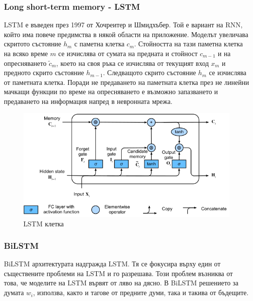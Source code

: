 \documentclass{article}
\begin{document}
\subsubsection{Long short-term memory - LSTM}

LSTM е въведен през 1997 от Хочреитер и Шмидхъбер. Той е вариант на RNN, който има повече предимства в някой области на
приложение. Моделът увеличава скритото състояние $h_m$ с паметна клетка $c_m$. Стойността на тази паметна клетка на
всяко време $m$ се изчислява от сумата на предната и стойност $c_{m{-}1}$ и на опресняването $\tilde{c}_m$, което на
своя ръка се изчислява от текущият вход $x_m$ и предното скрито състояние $h_{m{-}1}$. Следващото скрито състояние
$h_m$ се изчислява от паметната клетка. Поради не предаването на паметната клетка през не линейни мачкащи функции по
време на опресняването е възможно запазването и предаването на информация напред в невронната мрежа.
\cite{intro-to-nlp-mit}

\begin{figure}[H]
    \centering
    \captionsetup{justification=centering}
    \includegraphics[width=450px, keepaspectratio]{chapter-03/lstm.png}
    \caption{LSTM клетка}
\end{figure}

\subsubsection{BiLSTM}

BiLSTM архитектурата надгражда LSTM. Тя се фокусира върху един от съществените проблеми на LSTM и го разрешава. Този
проблем възниква от това, че моделите на LSTM вървят от ляво на дясно. В BiLSTM решението за думата $w_i$, използва,
както и тагове от предните думи, така и такива от бъдещите. \cite{intro-to-nlp-stanford}
\end{document}
